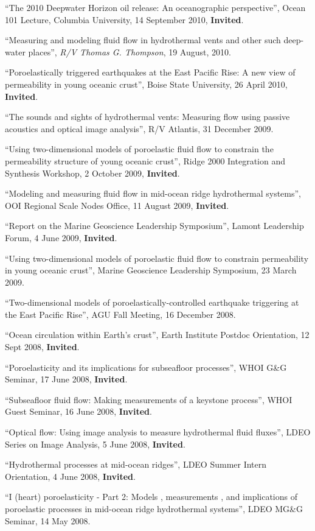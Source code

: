 \documentclass[11pt]{res}
\begin{document}
\begin{resume}
``The 2010 Deepwater Horizon oil release: An oceanographic perspective'', Ocean 101 Lecture, Columbia University, 14 September 2010, {\bf Invited}.

``Measuring and modeling fluid flow in hydrothermal vents and other such deep-water places'', {\em R/V Thomas G. Thompson}, 19 August, 2010.

``Poroelastically triggered earthquakes at the East Pacific Rise: A new view of permeability in young oceanic crust'', Boise State University, 26 April 2010, {\bf Invited}.

``The sounds and sights of hydrothermal vents: Measuring flow using passive acoustics and optical image analysis'', {\rm R/V Atlantis}, 31 December 2009.

``Using two-dimensional models of poroelastic fluid flow to constrain the permeability structure of young oceanic crust'', Ridge 2000 Integration and Synthesis Workshop, 2 October 2009, {\bf Invited}.

``Modeling and measuring fluid flow in mid-ocean ridge hydrothermal systems'', OOI Regional Scale Nodes Office, 11 August 2009, {\bf Invited}.

``Report on the Marine Geoscience Leadership Symposium'', Lamont Leadership Forum, 4 June 2009, {\bf Invited}.

``Using two-dimensional models of poroelastic fluid flow to constrain permeability in young oceanic crust'', Marine Geoscience Leadership Symposium, 23 March 2009.

``Two-dimensional models of poroelastically-controlled earthquake triggering at the East Pacific Rise'', AGU Fall Meeting, 16 December 2008.

``Ocean circulation within Earth's crust'', Earth Institute Postdoc Orientation, 12 Sept 2008, {\bf Invited}.

``Poroelasticity and its implications for subseafloor processes'', WHOI G\&G Seminar, 17 June 2008, {\bf Invited}.

``Subseafloor fluid flow: Making measurements of a keystone process'', WHOI Guest Seminar, 16 June 2008, {\bf Invited}.

``Optical flow: Using image analysis to measure hydrothermal fluid fluxes'', LDEO Series on Image Analysis, 5 June 2008, {\bf Invited}.

``Hydrothermal processes at mid-ocean ridges'', LDEO Summer Intern Orientation, 4 June 2008, {\bf Invited}.

``I (heart) poroelasticity - Part 2: Models , measurements , and implications of poroelastic processes in mid-ocean ridge hydrothermal systems'', LDEO MG\&G Seminar, 14 May 2008.


\end{resume}
\end{document}
